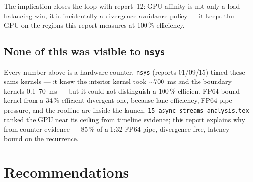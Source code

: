 \documentclass[
	english,
	letterpaper, oneside
]{article}
\begin{document}
The implication closes the loop with report~12: GPU affinity is not only a
load-balancing win, it is incidentally a divergence-avoidance policy ---
it keeps the GPU on the regions this report measures at 100\,\% efficiency.

\subsection{None of this was visible to \texttt{nsys}}

Every number above is a hardware counter. \texttt{nsys} (reports 01/09/15) timed
these same kernels --- it knew the interior kernel took $\sim$700~ms and the
boundary kernels 0.1--70~ms --- but it could not distinguish a 100\,\%-efficient
FP64-bound kernel from a 34\,\%-efficient divergent one, because lane efficiency,
FP64 pipe pressure, and the roofline are inside the launch.
\texttt{15-async-streams-analysis.tex} ranked the GPU near its ceiling from
timeline evidence; this report explains why from counter evidence ---
85\,\% of a 1:32 FP64 pipe, divergence-free, latency-bound on the recurrence.

\section{Recommendations}
\end{document}
